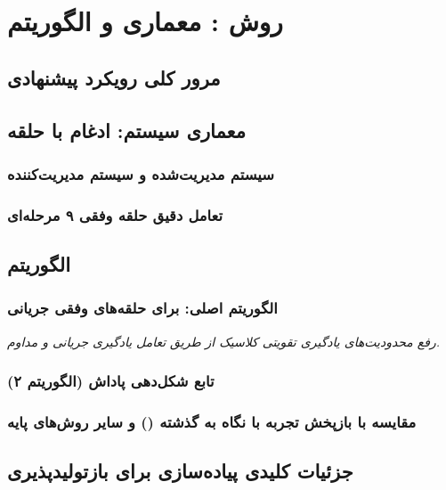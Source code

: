 \documentclass[12pt,a4paper]{report} %
\begin{document}
\newpage

\chapter{روش : معماری و الگوریتم}

\section{مرور کلی رویکرد پیشنهادی}

\section{معماری سیستم: ادغام  با حلقه }
\subsection{سیستم مدیریت‌شده و سیستم مدیریت‌کننده}
\subsection{تعامل دقیق حلقه وفقی ۹ مرحله‌ای}

\section{الگوریتم }
\subsection{الگوریتم اصلی:  برای حلقه‌های وفقی جریانی}
\textit{رفع محدودیت‌های یادگیری تقویتی کلاسیک از طریق تعامل یادگیری جریانی و مداوم.}
\subsection{تابع شکل‌دهی پاداش (الگوریتم ۲)}
\subsection{مقایسه با بازپخش تجربه با نگاه به گذشته () و سایر روش‌های پایه}

\section{جزئیات کلیدی پیاده‌سازی برای بازتولیدپذیری}
\end{document}

